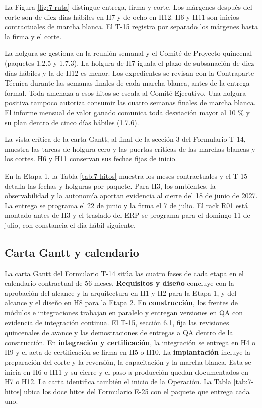 La Figura \ref{fig:7-ruta} distingue entrega, firma y corte. Los márgenes después del corte son de diez días hábiles en H7 y de ocho en H12. H6 y H11 son inicios contractuales de marcha blanca. El T-15 registra por separado los márgenes hasta la firma y el corte.

La holgura se gestiona en la reunión semanal y el Comité de Proyecto quincenal (paquetes 1.2.5 y 1.7.3). La holgura de H7 iguala el plazo de subsanación de diez días hábiles y la de H12 es menor. Los expedientes se revisan con la Contraparte Técnica durante las semanas finales de cada marcha blanca, antes de la entrega formal. Toda amenaza a esos hitos se escala al Comité Ejecutivo. Una holgura positiva tampoco autoriza consumir las cuatro semanas finales de marcha blanca. El informe mensual de valor ganado comunica toda desviación mayor al 10 \% y su plan dentro de cinco días hábiles (1.7.6).

La vista crítica de la carta Gantt, al final de la sección 3 del Formulario T-14, muestra las tareas de holgura cero y las puertas críticas de las marchas blancas y los cortes. H6 y H11 conservan sus fechas fijas de inicio.

En la Etapa 1, la Tabla \ref{tab:7-hitos} muestra los meses contractuales y el T-15 detalla las fechas y holguras por paquete. Para H3, los ambientes, la observabilidad y la autonomía aportan evidencia al cierre del 18 de junio de 2027. La entrega se programa el 22 de junio y la firma el 7 de julio. El rack R01 está montado antes de H3 y el traslado del ERP se programa para el domingo 11 de julio, con constancia el día hábil siguiente.

\subsection{Carta Gantt y calendario}

La carta Gantt del Formulario T-14 sitúa las cuatro fases de cada etapa en el calendario contractual de 56 meses. \textbf{Requisitos y diseño} concluye con la aprobación del alcance y la arquitectura en H1 y H2 para la Etapa 1, y del alcance y el diseño en H8 para la Etapa 2. En \textbf{construcción}, los frentes de módulos e integraciones trabajan en paralelo y entregan versiones en QA con evidencia de integración continua. El T-15, sección 6.1, fija las revisiones quincenales de avance y las demostraciones de entregas a QA dentro de la construcción. En \textbf{integración y certificación}, la integración se entrega en H4 o H9 y el acta de certificación se firma en H5 o H10. La \textbf{implantación} incluye la preparación del corte y la reversión, la capacitación y la marcha blanca. Esta se inicia en H6 o H11 y su cierre y el paso a producción quedan documentados en H7 o H12. La carta identifica también el inicio de la Operación. La Tabla \ref{tab:7-hitos} ubica los doce hitos del Formulario E-25 con el paquete que entrega cada uno.

